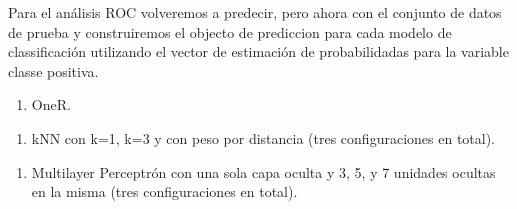 \documentclass[]{article}
\newenvironment{Shaded}{\begin{snugshade}}{\end{snugshade}}
\newcommand{\DataTypeTok}[1]{\textcolor[rgb]{0.13,0.29,0.53}{#1}}
\newcommand{\KeywordTok}[1]{\textcolor[rgb]{0.13,0.29,0.53}{\textbf{#1}}}
\newcommand{\NormalTok}[1]{#1}
\newcommand{\OperatorTok}[1]{\textcolor[rgb]{0.81,0.36,0.00}{\textbf{#1}}}
\newcommand{\StringTok}[1]{\textcolor[rgb]{0.31,0.60,0.02}{#1}}
\providecommand{\tightlist}{%
  \setlength{\itemsep}{0pt}\setlength{\parskip}{0pt}}
\begin{document}
Para el análisis ROC volveremos a predecir, pero ahora con el conjunto
de datos de prueba y construiremos el objecto de prediccion para cada
modelo de classificación utilizando el vector de estimación de
probabilidadas para la variable classe positiva.

\begin{enumerate}
\def\labelenumi{\arabic{enumi}.}
\tightlist
\item
  OneR.
\end{enumerate}

\begin{Shaded}
\end{Shaded}

\begin{enumerate}
\def\labelenumi{\arabic{enumi}.}
\setcounter{enumi}{1}
\tightlist
\item
  kNN con k=1, k=3 y con peso por distancia (tres configuraciones en
  total).
\end{enumerate}

\begin{Shaded}
\end{Shaded}

\begin{enumerate}
\def\labelenumi{\arabic{enumi}.}
\setcounter{enumi}{2}
\tightlist
\item
  Multilayer Perceptrón con una sola capa oculta y 3, 5, y 7 unidades
  ocultas en la misma (tres configuraciones en total).
\end{enumerate}
\end{document}
